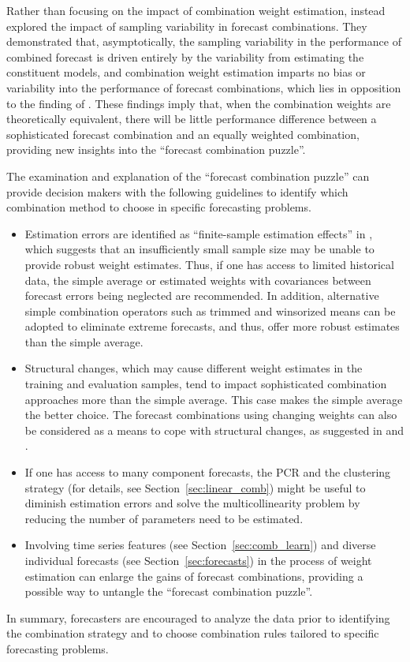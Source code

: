 \documentclass[a4paper,11pt]{article}
\begin{document}
Rather than focusing on the impact of combination weight estimation, \citet{Zischke2022-sv} instead explored the impact of sampling variability in forecast combinations. They demonstrated that, asymptotically, the sampling variability in the performance of combined forecast is driven entirely by the variability from estimating the constituent models, and combination weight estimation imparts no bias or variability into the performance of forecast combinations, which lies in opposition to the finding of \citet{Claeskens2016-pv}. These findings imply that, when the combination weights are theoretically equivalent, there will be little performance difference between a sophisticated forecast combination and an equally weighted combination, providing new insights into the ``forecast combination puzzle''.

The examination and explanation of the ``forecast combination puzzle'' can provide decision makers with the following guidelines to identify which combination method to choose in specific forecasting problems.
\begin{itemize}
  \item Estimation errors are identified as ``finite-sample estimation effects'' in \citet{Smith2009-wd}, which suggests that an insufficiently small sample size may be unable to provide robust weight estimates. Thus, if one has access to limited historical data, the simple average or estimated weights with covariances between forecast errors being neglected are recommended. In addition, alternative simple combination operators such as trimmed and winsorized means can be adopted to eliminate extreme forecasts, and thus, offer more robust estimates than the simple average.
  \item Structural changes, which may cause different weight estimates in the training and evaluation samples, tend to impact sophisticated combination approaches more than the simple average. This case makes the simple average the better choice. The forecast combinations using changing weights can also be considered as a means to cope with structural changes, as suggested in \citet{Diebold1987-go} and \citet{Deutsch1994-ob}.
  \item If one has access to many component forecasts, the PCR and the clustering strategy (for details, see Section~\ref{sec:linear_comb}) might be useful to diminish estimation errors and solve the multicollinearity problem by reducing the number of parameters need to be estimated.
  \item Involving time series features (see Section~\ref{sec:comb_learn}) and diverse individual forecasts (see Section~\ref{sec:forecasts}) in the process of weight estimation can enlarge the gains of forecast combinations, providing a possible way to untangle the ``forecast combination puzzle''.
\end{itemize}
In summary, forecasters are encouraged to analyze the data prior to identifying the combination strategy and to choose combination rules tailored to specific forecasting problems.
\end{document}
